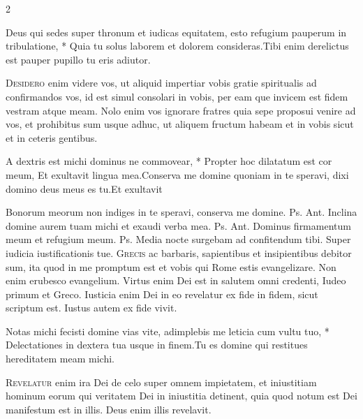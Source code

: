 \begin{multicols*}{2}
\begin{responsory}
{Deus qui sedes super thronum et iudicas equitatem, esto refugium pauperum in tribulatione, * Quia tu solus laborem et dolorem consideras.}{Tibi enim derelictus est pauper pupillo tu eris adiutor.}
\end{responsory}%
\lettrine[lines=2]{\zallmancaps \color{Red} D}{esidero} enim videre vos, ut aliquid impertiar vobis gratie spiritualis ad confirmandos vos, id est simul consolari in vobis, per eam que invicem est fidem vestram atque meam. Nolo enim vos ignorare fratres quia sepe proposui venire ad vos, et prohibitus sum usque adhuc, ut aliquem fructum habeam et in vobis sicut et in ceteris gentibus.
\begin{responsory-final}
{A dextris est michi dominus ne commovear, * Propter hoc dilatatum est cor meum, Et exultavit lingua mea.}{Conserva me domine quoniam in te speravi, dixi domino deus meus es tu.}{Et exultavit}
\end{responsory-final}%
 Bonorum meorum non indiges in te speravi, conserva me domine. {\color{Red} Ps.}  {\color{Red} Ant.} Inclina domine aurem tuam michi et exaudi verba mea. {\color{Red} Ps.}  {\color{Red} Ant.} Dominus firmamentum meum et refugium meum. {\color{Red} Ps.}  \V Media nocte surgebam ad confitendum tibi. \R Super iudicia iustificationis tue.
\lettrine[lines=2]{\zallmancaps \color{Blue} G}{recis} ac barbaris, sapientibus et insipientibus debitor sum, ita quod in me promptum est et vobis qui Rome estis evangelizare. Non enim erubesco evangelium. Virtus enim Dei est in salutem omni credenti, Iudeo primum et Greco. Iusticia enim Dei in eo revelatur ex fide in fidem, sicut scriptum est. Iustus autem ex fide vivit.
\begin{responsory}
{Notas michi fecisti domine vias vite, adimplebis me leticia cum vultu tuo, * Delectationes in dextera tua usque in finem.}{Tu es domine qui restitues hereditatem meam michi.}
\end{responsory}%
\lettrine[lines=2]{\zallmancaps \color{Red} R}{evelatur} enim ira Dei de celo super omnem impietatem, et iniustitiam hominum eorum qui veritatem Dei in iniustitia detinent, quia quod notum est Dei manifestum est in illis. Deus enim illis revelavit.

\end{multicols*}
